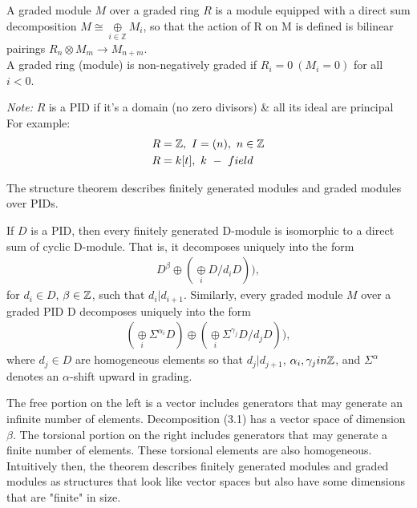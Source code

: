 \documentclass[11pt,a4paper]{report}
\begin{document}

               A graded module $M$ over a graded ring $R$ is a module equipped with a direct sum decomposition $M \cong \underset{i \in \mathbb{Z}}{\oplus} M_i$, so that the action of R on M is defined is bilinear pairings $R_n \otimes M_m \rightarrow M_{n+m}$. \\

              A graded ring (module) is non-negatively graded if $R_i = 0 \ (M_i = 0)$ for all $i < 0$.

              \emph{Note:} $R$ is a PID if it's a domain (no zero divisors) \& all its ideal are principal\\

             For example:
              \begin{align*}
                &R = \mathbb{Z}, \ I = (n),\ n \in \mathbb{Z} \\
                &R = k[t],\ k\ -\ field\\
              \end{align*}

              The structure theorem describes finitely generated modules and graded modules over PIDs.
              \begin{thm}  \label{Structure}
              If $D$ is a PID, then every finitely generated D-module is isomorphic to a direct sum of cyclic D-module. That is, it decomposes uniquely into the form
              \begin{align}
                D^\beta \oplus (\underset{i}{\oplus} D/d_iD)),
              \end{align}
              for $d_i \in D$, $\beta \in \mathbb{Z}$, such that $d_i| d_{i+1}.$ Similarly, every graded module $M$ over a graded PID D decomposes uniquely into the form
               \begin{align}
                (\underset{i}{\oplus} \Sigma^{\alpha_i} D) \oplus (\underset{i}{\oplus} \Sigma ^{\gamma_j} D/d_jD)),
              \end{align}
              where $d_j \in D$ are homogeneous elements so that $d_j|d_{j+1}$, $\alpha_i, \gamma_j in \mathbb{Z}$, and $\Sigma^\alpha$ denotes an $\alpha$-shift upward in grading.
              \end{thm}
              The free portion on the left is a vector includes generators that may generate an infinite number of elements. Decomposition (3.1) has a vector space of dimension $\beta$. The torsional portion on the right includes generators that
               may generate a finite number of elements. These torsional elements are also homogeneous. Intuitively then, the theorem describes finitely generated modules and graded modules as structures that look like vector spaces but also
                have some dimensions that are "finite" in size.
\end{document}
